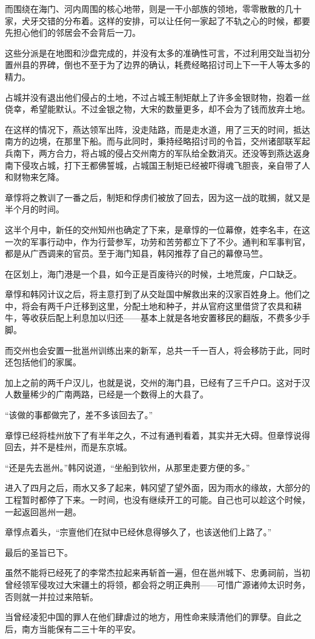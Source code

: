 而围绕在海门、河内周围的核心地带，则是一干小部族的领地，零零散散的几十家，犬牙交错的分布着。这样的安排，可以让任何一家起了不轨之心的时候，都要先担心他们的邻居会不会背后一刀。

这些分派是在地图和沙盘完成的，并没有太多的准确性可言，不过利用交趾当初分置州县的界碑，倒也不至于为了边界的确认，耗费经略招讨司上下一干人等太多的精力。

占城并没有退出他们侵占的土地，不过占城王制矩献上了许多金银财物，抱着一丝侥幸，希望能默认。不过金银之物，大宋的数量更多，却不会为了钱而放弃土地。

在这样的情况下，燕达领军出阵，没走陆路，而是走水道，用了三天的时间，抵达南方的边境，在那里下船。而与此同时，秉持经略招讨司的令旨，交州诸部联军起兵南下，两方合力，将占城的侵占交州南方的军队给全数消灭。还没等到燕达返身南下侵攻占城，打下王都佛誓城，占城国王制矩已经被吓得魂飞胆丧，亲自带了人和财物来乞降。

章惇将之教训了一番之后，制矩和俘虏们被放了回去，因为这一战的耽搁，就又是半个月的时间。

这半个月中，新任的交州知州也确定了下来，是章惇的一位幕僚，姓李名丰，在这一次的军事行动中，作为行营参军，功劳和苦劳都立下了不少。通判和军事判官，都是从广西调来的官员。至于海门知县，韩冈推荐了自己的幕僚马竺。

在区划上，海门港是一个县，如今正是百废待兴的时候，土地荒废，户口缺乏。

章惇和韩冈计议之后，将主意打到了从交趾国中解救出来的汉家百姓身上。他们之中，将会有两千户迁移到这里，分配土地和种子，并从官府这里借贷了农具和耕牛，等收获后配上利息加以归还——基本上就是各地安置移民的翻版，不费多少手脚。

而交州也会安置一批邕州训练出来的新军，总共一千一百人，将会移防于此，同时还包括他们的家属。

加上之前的两千户汉儿，也就是说，交州的海门县，已经有了三千户口。这对于汉人数量稀少的广南两路，已经是一个数得上的大县了。

“该做的事都做完了，差不多该回去了。”

章惇已经将桂州放下了有半年之久，不过有通判看着，其实并无大碍。但章惇说得回去，并不是桂州，而是东京城。

“还是先去邕州。”韩冈说道，“坐船到钦州，从那里走要方便的多。”

进入了四月之后，雨水又多了起来，韩冈望了望外面，因为雨水的缘故，大部分的工程暂时都停了下来。一时间，也没有继续开工的可能。自己也可以趁这个时候，一起返回邕州一趟。

章惇点着头，“宗亶他们在狱中已经休息得够久了，也该送他们上路了。”

最后的圣旨已下。

虽然不能将已经死了的李常杰拉起来再斩首一遍，但在邕州城下、忠勇祠前，当初曾经领军侵攻过大宋疆土的将领，都会将之明正典刑——可惜广源诸帅太识时务，否则就一并拉过来陪斩。

当曾经凌犯中国的罪人在他们肆虐过的地方，用性命来赎清他们的罪孽。自此之后，南方当能保有二三十年的平安。


